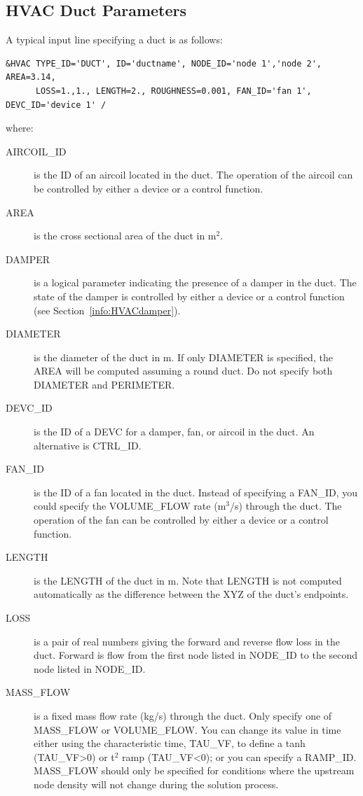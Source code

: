 \documentclass[11pt]{book}
\begin{document}
\subsection{HVAC Duct Parameters}
\label{info:HVACduct}

A typical input line specifying a duct is as follows:
\begin{lstlisting}
&HVAC TYPE_ID='DUCT', ID='ductname', NODE_ID='node 1','node 2', AREA=3.14,
      LOSS=1.,1., LENGTH=2., ROUGHNESS=0.001, FAN_ID='fan 1', DEVC_ID='device 1' /
\end{lstlisting}
where:
\begin{description}
\item[{\ct AIRCOIL\_ID}] is the {\ct ID} of an aircoil located in the duct.  The operation of the aircoil can be controlled by either a device or a control function.
\item[{\ct AREA}] is the cross sectional area of the duct in m$^2$.
\item[{\ct DAMPER}] is a logical parameter indicating the presence of a damper in the duct. The state of the damper is controlled by either a device or a control function (see Section~\ref{info:HVACdamper}).
\item[{\ct DIAMETER}] is the diameter of the duct in m.  If only {\ct DIAMETER} is specified, the {\ct AREA} will be computed assuming a round duct.  Do not specify both {\ct DIAMETER} and {\ct PERIMETER}.
\item[{\ct DEVC\_ID}]  is the {\ct ID} of a {\ct DEVC} for a damper, fan, or aircoil in the duct. An alternative is {\ct CTRL\_ID}.
\item[{\ct FAN\_ID}] is the {\ct ID} of a fan located in the duct. Instead of specifying a {\ct FAN\_ID}, you could specify the {\ct VOLUME\_FLOW} rate (m$^3$/s) through the duct. The operation of the fan can be controlled by either a device or a control function.
\item[{\ct LENGTH}] is the {\ct LENGTH} of the duct in m.  Note that {\ct LENGTH} is not computed automatically as the difference between the {\ct XYZ} of the duct's endpoints.
\item[{\ct LOSS}] is a pair of real numbers giving the forward and reverse flow loss in the duct.  Forward is flow from the first node listed in {\ct NODE\_ID} to the second node listed in {\ct NODE\_ID}.
\item[{\ct MASS\_FLOW}] is a fixed mass flow rate (kg/s) through the duct.  Only specify one of {\ct MASS\_FLOW} or {\ct VOLUME\_FLOW}.  You can change its value in time either using the characteristic time, {\ct TAU\_VF},  to define a tanh ({\ct TAU\_VF}>0) or t$^2$ ramp ({\ct TAU\_VF}<0); or you can specify a {\ct RAMP\_ID}.  {\ct MASS\_FLOW} should only be specified for conditions where the upstream node density will not change during the solution process.

\end{description}
\end{document}
